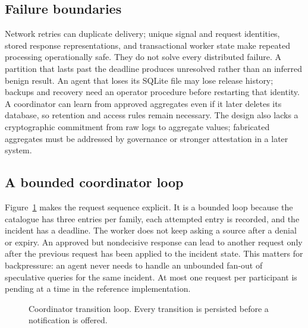 \documentclass[conference,letterpaper]{IEEEtran}
\begin{document}
\subsection{Failure boundaries}
Network retries can duplicate delivery; unique signal and request identities, stored response representations, and transactional worker state make repeated processing operationally safe. They do not solve every distributed failure. A partition that lasts past the deadline produces unresolved rather than an inferred benign result. An agent that loses its SQLite file may lose release history; backups and recovery need an operator procedure before restarting that identity. A coordinator can learn from approved aggregates even if it later deletes its database, so retention and access rules remain necessary. The design also lacks a cryptographic commitment from raw logs to aggregate values; fabricated aggregates must be addressed by governance or stronger attestation in a later system.

\subsection{A bounded coordinator loop}
Figure~\ref{fig:loop} makes the request sequence explicit. It is a bounded loop because the catalogue has three entries per family, each attempted entry is recorded, and the incident has a deadline. The worker does not keep asking a source after a denial or expiry. An approved but nondecisive response can lead to another request only after the previous request has been applied to the incident state. This matters for backpressure: an agent never needs to handle an unbounded fan-out of speculative queries for the same incident. At most one request per participant is pending at a time in the reference implementation.

\begin{figure}[t]
\centering
{}
\caption{Coordinator transition loop. Every transition is persisted before a notification is offered.}
\label{fig:loop}
\end{figure}
\end{document}
